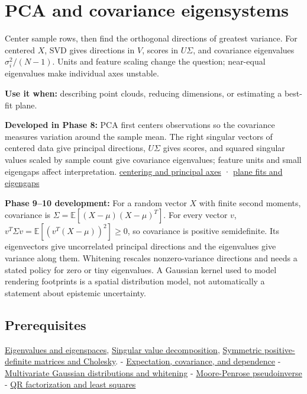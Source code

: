 \hypertarget{appendix-ad175ef3c5bf}{}
\section{PCA and covariance eigensystems}\label{appendix-ad175ef3c5bf-pca-and-covariance-eigensystems}

Center sample rows, then find the orthogonal directions of greatest variance. For centered \(X\), SVD gives directions in \(V\), scores in \(U\Sigma\), and covariance eigenvalues \(\sigma_i^2/(N-1)\). Units and feature scaling change the question; near-equal eigenvalues make individual axes unstable.

\textbf{Use it when:} describing point clouds, reducing dimensions, or estimating a best-fit plane.

\textbf{Developed in Phase 8:} PCA first centers observations so the covariance measures variation around the sample mean. The right singular vectors of centered data give principal directions, \(U\Sigma\) gives scores, and squared singular values scaled by sample count give covariance eigenvalues; feature units and small eigengaps affect interpretation. \hyperref[02-foundations-ii-ch024-centered-measurements-reveal-principal-directions]{centering and principal axes} · \hyperref[02-foundations-ii-ch024-plane-fits-eigengaps-and-interpretation-of-uncertain-components]{plane fits and eigengaps}

\textbf{Phase 9--10 development:} For a random vector \(X\) with finite second moments, covariance is \(\Sigma=\mathbb E[(X-\mu)(X-\mu)^T]\). For every vector \(v\), \(v^T\Sigma v=\mathbb E[(v^T(X-\mu))^2]\geq0\), so covariance is positive semidefinite. Its eigenvectors give uncorrelated principal directions and the eigenvalues give variance along them. Whitening rescales nonzero-variance directions and needs a stated policy for zero or tiny eigenvalues. A Gaussian kernel used to model rendering footprints is a spatial distribution model, not automatically a statement about epistemic uncertainty.

\subsection{Prerequisites}\label{appendix-ad175ef3c5bf-prerequisites}

\hyperref[appendix-0b3be18411f9]{Eigenvalues and eigenspaces}, \hyperref[appendix-1fad5e7f36fa]{Singular value decomposition}, \hyperref[appendix-50d2ea3c9b26]{Symmetric positive-definite matrices and Cholesky}. - \hyperref[appendix-54c383df9992]{Expectation, covariance, and dependence} - \hyperref[appendix-12bbe185dbe5]{Multivariate Gaussian distributions and whitening} - \hyperref[appendix-541306fdbc1b]{Moore-Penrose pseudoinverse} - \hyperref[appendix-c3421e6b4f2c]{QR factorization and least squares}

